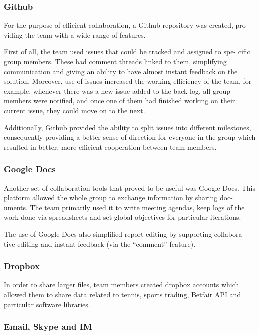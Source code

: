\documentclass[10pt]{report}
\begin{document}
\subsubsection{Github}

For the purpose of efficient collaboration, a Github repository was created, pro-
viding the team with a wide range of features.

First of all, the team used issues that could be tracked and assigned to spe-
cific group members. These had comment threads linked to them, simplifying
communication and giving an ability to have almost instant feedback on the
solution. Moreover, use of issues increased the working efficiency of the team,
for example, whenever there was a new issue added to the back log, all group
members were notified, and once one of them had finished working on their
current issue, they could move on to the next.

Additionally, Github provided the ability to split issues into different milestones,
consequently providing a better sense of direction for everyone in the group
which resulted in better, more efficient cooperation between team members.

\subsubsection{Google Docs}

Another set of collaboration tools that proved to be useful was Google Docs.
This platform allowed the whole group to exchange information by sharing doc-
uments. The team primarily used it to write meeting agendas, keep logs of the
work done via spreadsheets and set global objectives for particular iterations.

The use of Google Docs also simplified report editing by supporting collabora-
tive editing and instant feedback (via the ``comment'' feature).


\subsubsection{Dropbox}
In order to share larger files, team members created dropbox accounts which
allowed them to share data related to tennis, sports trading, Betfair API and
particular software libraries.

\subsubsection{Email, Skype and IM}
\end{document}
